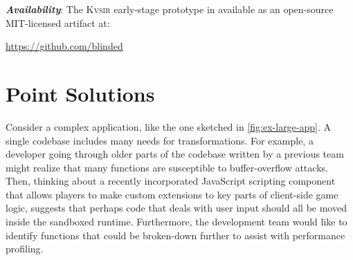 \documentclass[sigplan,review,anonymous,10pt]{acmart}
\newcommand{\sys}{{\scshape Kv{\textalpha}sir}\xspace}
\newcommand{\heading}[1]{\vspace{2pt}\noindent\textbf{\emph{#1}}:\enspace}
\begin{document}

\heading{Availability}
The \sys early-stage prototype in available as an open-source MIT-licensed artifact at:
\begin{center}
  \url{https://github.com/blinded}
\end{center}



\section{Point Solutions}
\label{sec:problem}

Consider a complex application, like the one
sketched in \cref{fig:ex-large-app}.
A single codebase includes many needs for transformations.
For example, a developer going through older parts of the codebase written by 
a previous team might realize that many functions are susceptible to buffer-overflow attacks.
Then, thinking about a recently incorporated JavaScript scripting component 
that allows players to make custom extensions to key parts of client-side game logic, 
suggests that perhaps code that deals with user input should all be moved inside 
the sandboxed runtime.
Furthermore, the development team would like to identify functions that could 
be broken-down further to assist with performance profiling.
\end{document}
